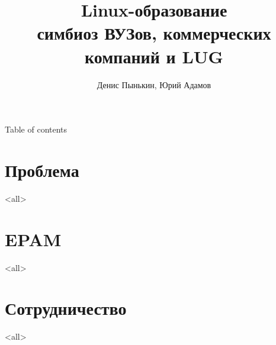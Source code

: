 
\graphicspath{{../lvee2013-winter/clipart/}}
\title{Linux-образование \\ симбиоз ВУЗов, коммерческих компаний и LUG}
\author{Денис Пынькин, Юрий Адамов}



\begin{frame}
	\titlepage
\end{frame}

\begin{frame}{Table of contents}
	\tableofcontents
\end{frame}


\section{Проблема}
\mode<all>{}
\section{EPAM}
\mode<all>{}
\section{Сотрудничество}
\mode<all>{}

